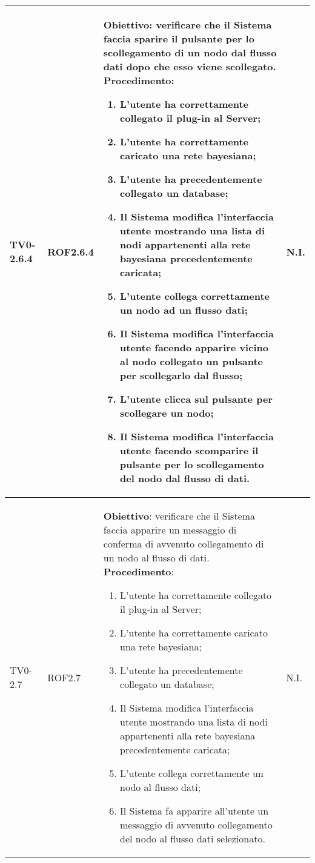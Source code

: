 \begin{longtable}{|C{.15\textwidth}|C{.13\textwidth}|m{.52\textwidth}|C{.08\textwidth}|}
TV0-2.6.4 & ROF2.6.4 &
	\textbf{Obiettivo}: verificare che il Sistema faccia sparire il pulsante per lo scollegamento di un nodo dal flusso dati dopo che esso viene scollegato. \newline
	\textbf{Procedimento}:
	\begin{enumerate}
		\item L'utente ha correttamente collegato il plug-in al Server;
		\item L'utente ha correttamente caricato una rete bayesiana;
		\item L'utente ha precedentemente collegato un database;
		\item Il Sistema modifica l'interfaccia utente mostrando una lista di nodi appartenenti alla rete bayesiana precedentemente caricata;
		\item L'utente collega correttamente un nodo ad un flusso dati;
		\item Il Sistema modifica l'interfaccia utente facendo apparire vicino al nodo collegato un pulsante per scollegarlo dal flusso;
		\item L'utente clicca sul pulsante per scollegare un nodo;
		\item Il Sistema modifica l'interfaccia utente facendo scomparire il pulsante per lo scollegamento del nodo dal flusso di dati. 
	\end{enumerate}
	& N.I. \\
\hline

TV0-2.7 & ROF2.7 &
	\textbf{Obiettivo}: verificare che il Sistema faccia apparire un messaggio di conferma di avvenuto collegamento di un nodo al flusso di dati. \newline
	\textbf{Procedimento}:
	\begin{enumerate}
		\item L'utente ha correttamente collegato il plug-in al Server;
		\item L'utente ha correttamente caricato una rete bayesiana;
		\item L'utente ha precedentemente collegato un database;
		\item Il Sistema modifica l'interfaccia utente mostrando una lista di nodi appartenenti alla rete bayesiana precedentemente caricata;
		\item L'utente collega correttamente un nodo al flusso dati;
		\item Il Sistema fa apparire all'utente un messaggio di avvenuto collegamento del nodo al flusso dati selezionato.
	\end{enumerate}
	& N.I. \\
\hline


\end{longtable}
